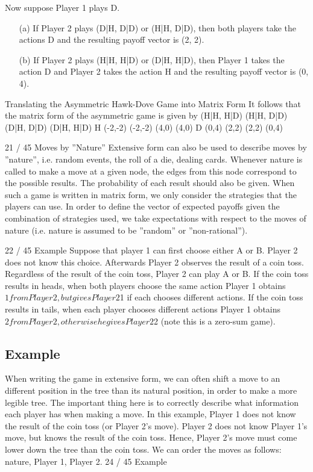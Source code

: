 \documentclass[]{report}
\begin{document}
Now suppose Player 1 plays D.
\begin{itemize}
	\item [(a)] If Player 2 plays (D|H, D|D) or (H|H, D|D), then both players
	take the actions D and the resulting payoff vector is (2, 2).
	\item [(b)] If Player 2 plays (H|H, H|D) or (D|H, H|D), then Player 1 takes
	the action D and Player 2 takes the action H and the resulting
	payoff vector is (0, 4).
\end{itemize}

Translating the Asymmetric Hawk-Dove Game into Matrix
Form
It follows that the matrix form of the asymmetric game is given by
(H|H, H|D) (H|H, D|D) (D|H, D|D) (D|H, H|D)
H (-2,-2) (-2,-2) (4,0) (4,0)
D (0,4) (2,2) (2,2) (0,4)

21 / 45
Moves by ”Nature”
Extensive form can also be used to describe moves by ”nature”,
i.e. random events, the roll of a die, dealing cards.
Whenever nature is called to make a move at a given node, the
edges from this node correspond to the possible results. The
probability of each result should also be given.
When such a game is written in matrix form, we only consider the
strategies that the players can use. In order to define the vector of
expected payoffs given the combination of strategies used, we
take expectations with respect to the moves of nature (i.e. nature
is assumed to be ”random” or ”non-rational”).


22 / 45
Example
Suppose that player 1 can first choose either A or B. Player 2 does
not know this choice.
Afterwards Player 2 observes the result of a coin toss. Regardless
of the result of the coin toss, Player 2 can play A or B.
If the coin toss results in heads, when both players choose the
same action Player 1 obtains $1 from Player 2, but gives Player 2
$1 if each chooses different actions. If the coin toss results in tails,
when each player chooses different actions Player 1 obtains $2
from Player 2, otherwise he gives Player 2 $2 (note this is a
zero-sum game).

\subsection{Example}
When writing the game in extensive form, we can often shift a
move to an different position in the tree than its natural position,
in order to make a more legible tree.
The important thing here is to correctly describe what information
each player has when making a move.
In this example, Player 1 does not know the result of the coin toss
(or Player 2’s move).
Player 2 does not know Player 1’s move, but knows the result of
the coin toss. Hence, Player 2’s move must come lower down the
tree than the coin toss. We can order the moves as follows:
nature, Player 1, Player 2.
24 / 45
Example
\end{document}
